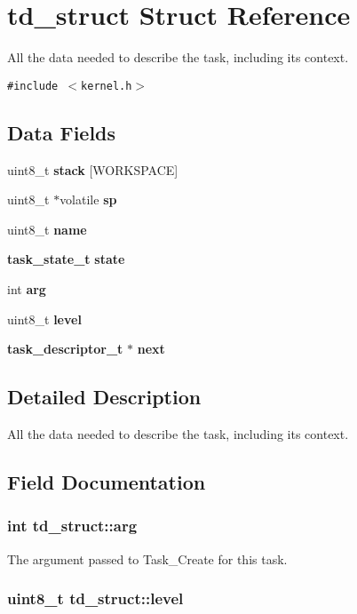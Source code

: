 \section{td\_\-struct Struct Reference}
\label{structtd__struct}
All the data needed to describe the task, including its context.  


{\tt \#include $<$kernel.h$>$}

\subsection*{Data Fields}
\begin{CompactItemize}
\item 
uint8\_\-t {\bf stack} [WORKSPACE]
\item 
uint8\_\-t $\ast$volatile {\bf sp}
\item 
uint8\_\-t {\bf name}
\item 
{\bf task\_\-state\_\-t} {\bf state}
\item 
int {\bf arg}
\item 
uint8\_\-t {\bf level}
\item 
{\bf task\_\-descriptor\_\-t} $\ast$ {\bf next}
\end{CompactItemize}


\subsection{Detailed Description}
All the data needed to describe the task, including its context. 



\subsection{Field Documentation}
\subsubsection{\setlength{\rightskip}{0pt plus 5cm}int {\bf td\_\-struct::arg}}\label{structtd__struct_7e09b50b1cfad70415657977293c2e46}


The argument passed to Task\_\-Create for this task. 
\subsubsection{\setlength{\rightskip}{0pt plus 5cm}uint8\_\-t {\bf td\_\-struct::level}}\label{structtd__struct_49ff6510ab79647ea827e79bded30d5e}


